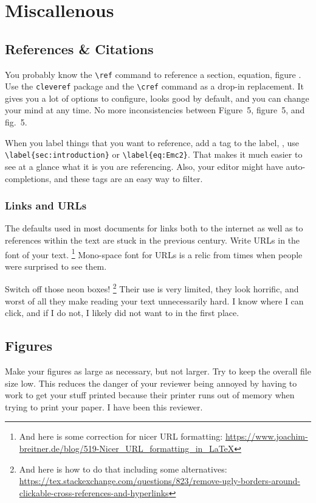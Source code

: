 \section{Miscallenous}

\subsection{References \& Citations}


You probably know the \verb|\ref| command to reference a section, equation, figure \etc.
Use the \texttt{cleveref} package and the \verb|\cref| command as a drop-in replacement.
It gives you a lot of options to configure, looks good by default, and you can change your mind at any time.
No more inconsistencies between Figure~5, figure~5, and fig.~5.


When you label things that you want to reference, add a tag to the label, \eg, use \verb|\label{sec:introduction}| or \verb|\label{eq:Emc2}|.
That makes it much easier to see at a glance what it is you are referencing.
Also, your editor might have auto-completions, and these tags are an easy way to filter.

\subsubsection{Links and URLs}
The defaults used in most documents for links both to the internet as well as to references within the text are stuck in the previous century.
Write URLs in the font of your text.%
\footnote{And here is some correction for nicer URL formatting: \url{https://www.joachim-breitner.de/blog/519-Nicer_URL_formatting_in_LaTeX}}
Mono-space font for URLs is a relic from times when people were surprised to see them.


Switch off those neon boxes!%
\footnote{And here is how to do that including some alternatives: \url{https://tex.stackexchange.com/questions/823/remove-ugly-borders-around-clickable-cross-references-and-hyperlinks}}
Their use is very limited, they look horrific, and  worst of all they make reading your text unnecessarily hard.
I know where I can click, and if I do not, I likely did not want to in the first place.

\subsection{Figures}
Make your figures as large as necessary, but not larger. 
Try to keep the overall file size low. 
This reduces the danger of your reviewer being annoyed by having to work to get your stuff printed because their printer runs out of memory when trying to print your paper.
I have been this reviewer.

